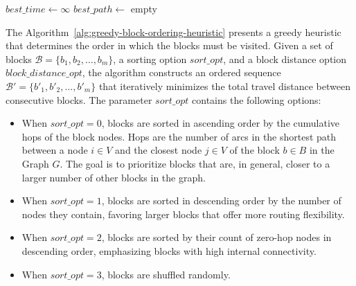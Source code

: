 \begin{algorithm}[h!]
	\caption{Heuristic Block Connection}\label{alg:heuristic-block-connection}
	\SetAlgoLined

	$best\_time \leftarrow \infty$\;
	$best\_path \leftarrow$ empty\;

	\;
\end{algorithm}

The Algorithm~\ref{alg:greedy-block-ordering-heuristic} presents a greedy heuristic that determines the order in which the blocks must be visited. Given a set of blocks $\mathcal{B} = \{b_1, b_2, \ldots, b_m\}$, a sorting option $sort\_opt$, and a block distance option $block\_distance\_opt$, the algorithm constructs an ordered sequence $\mathcal{B}' = \{b'_1, b'_2, \ldots, b'_m\}$ that iteratively minimizes the total travel distance between consecutive blocks. The parameter $sort\_opt$ contains the following options:

\begin{itemize}
	\item When $sort\_opt = 0$, blocks are sorted in ascending order by the cumulative hops of the block nodes. Hops are the number of arcs in the shortest path between a node $i \in V$ and the closest node $j \in V$ of the block $b \in B$ in the Graph $G$. The goal is to prioritize blocks that are, in general, closer to a larger number of other blocks in the graph.
	\item When $sort\_opt = 1$, blocks are sorted in descending order by the number of nodes they contain, favoring larger blocks that offer more routing flexibility.
	\item When $sort\_opt = 2$, blocks are sorted by their count of zero-hop nodes in descending order, emphasizing blocks with high internal connectivity.
	\item When $sort\_opt = 3$, blocks are shuffled randomly.
\end{itemize}

